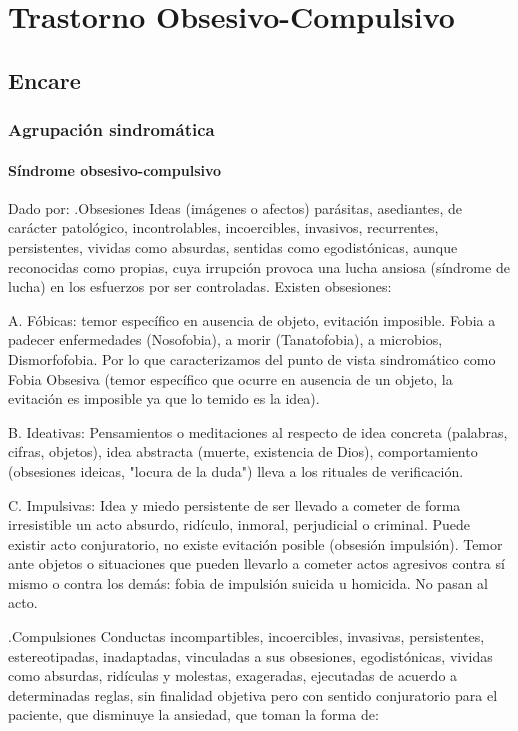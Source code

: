 \documentclass[encares.tex]{subfiles}
\begin{document}
\section*{Trastorno Obsesivo-Compulsivo}
\subsection*{Encare}
\subsubsection*{Agrupación sindromática}
\paragraph*{Síndrome obsesivo-compulsivo}
Dado por:
.Obsesiones
Ideas (imágenes o afectos) parásitas, asediantes, de carácter patológico, incontrolables, incoercibles, invasivos, recurrentes, persistentes, vividas como absurdas, sentidas como egodistónicas, aunque reconocidas como propias, cuya irrupción provoca una lucha ansiosa (síndrome de lucha) en los esfuerzos por ser controladas. Existen obsesiones:

A. Fóbicas: temor específico en ausencia de objeto, evitación imposible. Fobia a padecer enfermedades (Nosofobia), a morir (Tanatofobia), a microbios, Dismorfofobia. Por lo que caracterizamos del punto de vista sindromático como Fobia Obsesiva (temor específico que ocurre en ausencia de un objeto, la evitación es imposible ya que lo temido es la idea).

B. Ideativas: Pensamientos o meditaciones al respecto de idea concreta (palabras, cifras, objetos), idea abstracta (muerte, existencia de Dios), comportamiento (obsesiones ideicas, "locura de la duda") lleva a los rituales de verificación.

C. Impulsivas: Idea y miedo persistente de ser llevado a cometer de forma irresistible un acto absurdo, ridículo, inmoral, perjudicial o criminal. Puede existir acto conjuratorio, no existe evitación posible (obsesión impulsión). Temor ante objetos o situaciones que pueden llevarlo a cometer actos agresivos contra sí mismo o contra los demás: fobia de impulsión suicida u homicida. No pasan al acto.

.Compulsiones
Conductas incompartibles, incoercibles, invasivas, persistentes, estereotipadas, inadaptadas, vinculadas a sus obsesiones, egodistónicas, vividas como absurdas, ridículas y molestas, exageradas, ejecutadas de acuerdo a determinadas reglas, sin finalidad objetiva pero con sentido conjuratorio para el paciente, que disminuye la ansiedad, que toman la forma de:
\end{document}
